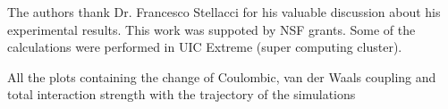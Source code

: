 \documentclass[journal=jacsat,manuscript=communication]{achemso}
\begin{document}
%
%
%
%

\begin{acknowledgement}
The authors thank Dr. Francesco Stellacci for his valuable discussion
about his experimental results. This work was suppoted by NSF grants.
Some of the calculations were performed in UIC Extreme (super
computing cluster). 
\end{acknowledgement}

\begin{suppinfo}
All the plots containing the change of Coulombic, van der Waals
coupling and total interaction strength with the trajectory of the
simulations
\end{suppinfo}



\end{document}
